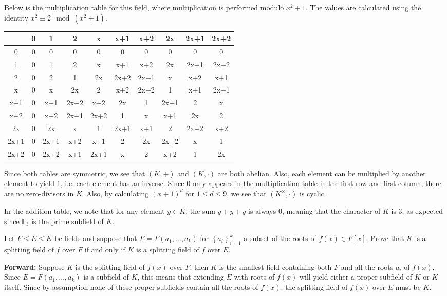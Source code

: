 \documentclass[10pt]{report}
\begin{document}
Below is the multiplication table for this field, where multiplication is performed modulo $x^2+1$. The values are calculated using the identity $x^2 \equiv 2 \mod (x^2+1)$.
\begin{center}
	\begin{tabular}{ c||c|c|c|c|c|c|c|c|c }
		&0&1&2&x&x+1&x+2&2x&2x+1&2x+2\\
		\hline \hline
		0&0&0&0&0&0&0&0&0&0\\
		1&0&1&2&x&x+1&x+2&2x&2x+1&2x+2\\
		2&0&2&1&2x&2x+2&2x+1&x&x+2&x+1\\
		x&0&x&2x&2&x+2&2x+2&1&x+1&2x+1\\
		x+1&0&x+1&2x+2&x+2&2x&1&2x+1&2&x\\
		x+2&0&x+2&2x+1&2x+2&1&x&x+1&2x&2\\
		2x&0&2x&x&1&2x+1&x+1&2&2x+2&x+2\\
		2x+1&0&2x+1&x+2&x+1&2&2x&2x+2&x&1\\
		2x+2&0&2x+2&x+1&2x+1&x&2&x+2&1&2x
	\end{tabular}
\end{center}
Since both tables are symmetric, we see that $(K,+)$ and $(K,\cdot)$ are both abelian. Also, each element can be multiplied by another element to yield 1, i.e. each element has an inverse. Since 0 only appears in the multiplication table in the first row and first column, there are no zero-divisors in $K$. Also, by calculating $(x+1)^d$ for $1 \leq d \leq 9$, we see that $(K^{\times},\cdot)$ is cyclic.

In the addition table, we note that for any element $y \in K$, the sum $y + y + y$ is always 0, meaning that the character of $K$ is 3, as expected since $\mathbb{F}_{3}$ is the prime subfield of $K$.
\newpage

\begin{exer}[]
	Let $F\leq E \leq K$ be fields and suppose that $E = F({a}_1, \dots, {a}_{k})$ for $\left\{ a_i \right\}_{i=1}^k$ a subset of the roots of $f(x) \in F[x]$. Prove that $K$ is a splitting field of $f$ over $F$ if and only if $K$ is a splitting field of $f$ over $E$.
\end{exer}
\textbf{Forward:} Suppose $K$ is the splitting field of $f(x)$ over $F$, then $K$ is the smallest field containing both $F$ and all the roots $a_i$ of $f(x)$. Since $E = F({a}_1, \dots, {a}_{k})$ is a subfield of $K$, this means that extending $E$ with roots of $f(x)$ will yield either a proper subfield of $K$ or $K$ itself. Since by assumption none of these proper subfields contain all the roots of $f(x)$, the splitting field of $f(x)$ over $E$ must be $K$.
\end{document}
